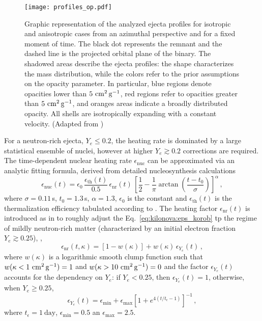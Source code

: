 \begin{figure}
    \centering 
    \texttt{[image: profiles\_op.pdf]}
    \caption{Graphic representation of the analyzed
        ejecta profiles for isotropic and anisotropic cases
        from an azimuthal perspective and for a fixed moment of time.
        The black dot represents the remnant and the dashed line is the projected orbital
        plane of the binary. The shadowed areas describe the ejecta profiles: the shape
        characterizes the mass distribution, while the colors refer to 
        the prior assumptions on the opacity parameter.
        In particular, blue regions denote opacities lower than $5~{\rm cm^{2}\,g^{-1}}$,
        red regions refer to opacities greater than $5~{\rm cm^{2}\,g^{-1}}$,
        and oranges areas indicate a broadly distributed opacity.
        All shells are isotropically expanding with a constant velocity.
        (Adapted from \citet{Breschi:2021wzr})
    }
    \label{fig:cartoon}
\end{figure}


For a neutron-rich ejecta, $Y_e\leq 0.2$, the heating rate is dominated by a large statistical 
ensemble of nuclei, however at higher $Y_e\gtrsim 0.2$ corrections are required. 
The time-dependent nuclear heating rate $\epsilon_{\text{nuc}}$ 
can be approximated via an analytic fitting formula, derived from detailed nucleosynthesis 
calculations~\citep{Korobkin:2012uy}  
%
\begin{equation}
\label{eq:kilonova:eps_korob}
\epsilon_{\text{nuc}}(t)= \epsilon_0 \, \frac{\epsilon_{\text{th}}(t)}{0.5} \, \epsilon_{\text{nr}}(t) \,
\left[ \frac{1}{2} - \frac{1}{\pi} \arctan\left(\frac{t-t_0}{\sigma}\right)\right]^{\alpha}\,,
\end{equation}
%
where $\sigma = 0.11\,$s, $t_0 = 1.3\,$s, $\alpha=1.3$,
$\epsilon_0$ is the constant and 
$\epsilon_{\text{th}}(t)$ is the 
thermalization efficiency tabulated according to \citet{Barnes:2016umi}.
%
The heating factor $\epsilon_{\text{nr}}(t) $ is introduced as in \citet{Perego:2017wtu} to roughly adjust 
the Eq.~\eqref{eq:kilonova:eps_korob} tp the regime of mildly neutron-rich 
matter (characterized by an initial 
electron fraction $Y_e \gtrsim 0.25$), \citep[see, \eg][]{Martin:2015hxa}, 
%
\begin{equation}
\label{eq:epsnr}
\epsilon_{\text{nr}}(t,\kappa) = \left[1-w(\kappa)\right] + w(\kappa)\,\epsilon_{Y_e}(t)\,,  
\end{equation}
%
where $w(\kappa)$ is a logarithmic smooth clump function such that $w(\kappa < 1~{\rm cm^{2}\,g^{-1}}) = 1$ and 
$w(\kappa > 10~{\rm cm^{2}\,g^{-1}})=0$ and the factor $\epsilon_{Y_e}(t)$ accounts for the dependency on $Y_e$:
if $Y_e < 0.25$, then $\epsilon_{Y_e}(t)=1$, otherwise, when $Y_e \ge 0.25$,
%
\begin{equation}
\label{eq:epsye}
\epsilon_{Y_e}(t) =\epsilon_{\text{min}}+{\epsilon_{\text{max}}}{\left[1+ e ^{4(t/t_\epsilon-1)}\right]}^{-1}\,,
\end{equation}
%
where $t_\epsilon = 1~{\text{day}}$, $\epsilon_{\text{min}}=0.5$ an $\epsilon_{\text{max}} = 2.5$.

